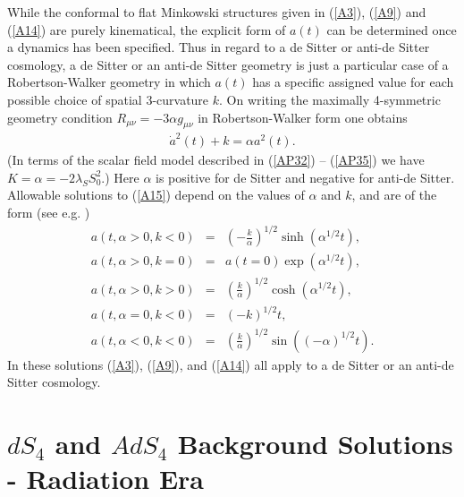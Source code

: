While the conformal to flat Minkowski structures given in (\ref{A3}), (\ref{A9}) and (\ref{A14}) are purely kinematical, the explicit form of $a(t)$ can be determined once a dynamics has been specified. Thus in regard to a de Sitter or anti-de Sitter cosmology, a de Sitter or an anti-de Sitter geometry is  just a particular case of a Robertson-Walker geometry in which $a(t)$ has a specific assigned value for each possible choice of  spatial 3-curvature $k$. On writing the  maximally 4-symmetric geometry condition $R_{\mu\nu}=-3\alpha g_{\mu\nu}$ in Robertson-Walker form one obtains 
%
\begin{eqnarray} 
\dot{a}^2(t) +k=\alpha  a^2(t).
\label{A15}
\end{eqnarray}
%
(In terms of the scalar field model described in (\ref{AP32}) -- (\ref{AP35}) we have $K=\alpha =-2\lambda_{S}S^2_0$.) Here $\alpha$ is positive for de Sitter and negative for anti-de Sitter. Allowable solutions to (\ref{A15}) depend on the values of $\alpha$ and $k$, and are of the form (see e.g. \cite{Mannheim2006})
%
\begin{eqnarray}
a(t,\alpha>0,k<0)&=&\left(-\frac{k}{\alpha}\right)^{1/2}
\sinh(\alpha^{1/2}t),
\nonumber \\
a(t,\alpha>0,k=0)&=&a(t=0)\exp(\alpha^{1/2}t),
\nonumber \\
a(t,\alpha>0,k>0)&=&\left(\frac{k}{\alpha}\right)^{1/2}\cosh(\alpha^{1/2}t),
\nonumber \\
a(t,\alpha=0,k<0)&=&(-k)^{1/2}t,
\nonumber \\
a(t,\alpha<0,k<0)&=&\left(\frac{k}{\alpha}\right)^{1/2}\sin((-\alpha)^{1/2}t).
\label{A16}
\end{eqnarray}
%
In these solutions (\ref{A3}), (\ref{A9}), and (\ref{A14}) all apply  to a de Sitter or an anti-de Sitter cosmology.

\section{$dS_4$ and $AdS_4$ Background Solutions - Radiation Era}
\label{abs:ds4_ads4_radiation}

